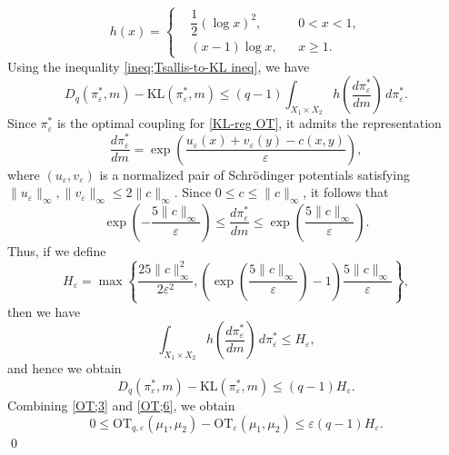 \documentclass[a4paper,11pt]{article}
\theoremstyle{plain}
\theoremstyle{definition}
\theoremstyle{remark}
\theoremstyle{plain}
\newenvironment{pf}[1]
{{\noindent\textbf{Proof of #1.}}}{\hfill \qed}
\numberwithin{equation}{section}
\newcommand{\ep}{\varepsilon}
\newcommand{\1}{\mbox{1}\hspace{-0.25em}\mbox{l}} %
\begin{document}
\begin{pf}{Theorem \ref{thm;2}}
\begin{equation*}
h(x)
=
\left\{
\begin{aligned}
&\dfrac{1}{2}(\log x)^2, && 0<x<1,\\
&(x-1)\log x, && x\geq1.
\end{aligned}
\right.
\end{equation*}
Using the inequality \eqref{ineq;Tsallis-to-KL ineq}, we have 
\begin{equation*}
D_q(\pi_\ep^*, m) - \mathrm{KL}(\pi_\ep^*, m)
  \leq (q - 1) \int_{X_1 \times X_2} h\left(\frac{d \pi_\ep^*}{dm}\right)\, d\pi_\ep^*.
\end{equation*}
Since $\pi_\ep^*$ is the optimal coupling for \eqref{KL-reg OT}, it admits the representation
\begin{equation*}
 \frac{d\pi_\ep^*}{dm} = \exp \left( \frac{u_\ep(x) + v_\ep(y) - c(x, y)}{\ep} \right),
\end{equation*}
where $(u_\ep,v_\ep)$ is a normalized pair of Schr\"odinger potentials satisfying $\|u_\ep\|_\infty,\|v_\ep\|_\infty\leq2\|c\|_\infty$. Since $0\leq c\leq\|c\|_\infty$, it follows that
\begin{equation*}
\exp\left(-\frac{5\|c\|_\infty}{\ep}\right) \leq \frac{d\pi_\ep^*}{dm} \leq \exp\left(\frac{5\|c\|_\infty}{\ep}\right).
\end{equation*}
Thus, if we define
\begin{equation*}
H_\ep = \max \left\{ \frac{25 \|c\|_\infty^2}{2\ep^2}, \left( \exp\left(\frac{5\|c\|_\infty}{\ep}\right)-1 \right)\frac{5 \|c\|_\infty}{\ep}
\right\},
\end{equation*}
then we have
\begin{equation*}
\int_{X_1 \times X_2} h\left(\frac{d \pi^*_\ep}{dm}\right)\, d\pi^*_\ep \leq H_\ep, 
\end{equation*}
and hence we obtain
\begin{equation}\label{OT;6}
  D_q(\pi_\ep^*, m) - \mathrm{KL}(\pi_\ep^*, m) \leq (q - 1) H_\ep.
\end{equation}
Combining \eqref{OT;3} and \eqref{OT;6}, we obtain
\begin{equation*}
0 \leq \mathrm{OT}_{q,\ep}(\mu_1, \mu_2) - \mathrm{OT}_{\ep}(\mu_1, \mu_2)
\leq \ep (q - 1) H_\ep.
\end{equation*}
\end{pf}
\end{document}
